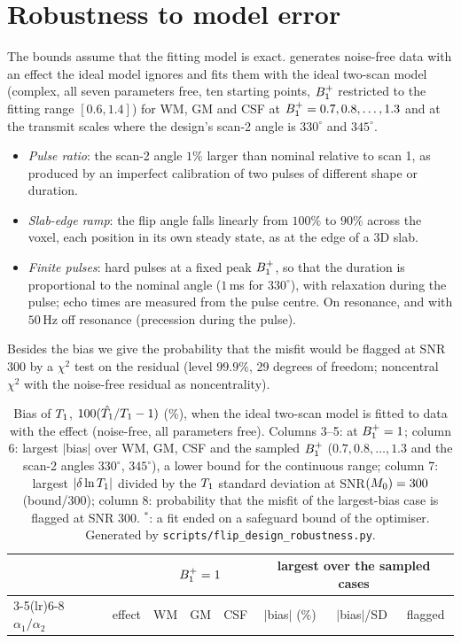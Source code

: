 \section{Robustness to model error}\label{sec:robustness}

The bounds assume that the fitting model is exact.  generates noise-free
data with an effect the ideal model ignores and fits them with the ideal two-scan model (complex,
all seven parameters free, ten starting points, $B_1^{+}$ restricted to the fitting range $[0.6,1.4]$) for
WM, GM and CSF at $B_1^{+}=0.7,0.8,\dots,1.3$ and at the transmit scales where the design's scan-2 angle is
$330^\circ$ and $345^\circ$.
\begin{itemize}
\item \emph{Pulse ratio}: the scan-2 angle $1\%$ larger than nominal relative to scan 1, as produced
  by an imperfect calibration of two pulses of different shape or duration.
\item \emph{Slab-edge ramp}: the flip angle falls linearly from $100\%$ to $90\%$ across the voxel, each
  position in its own steady state, as at the edge of a 3D slab.
\item \emph{Finite pulses}: hard pulses at a fixed peak $B_1^{+}$, so that the duration is proportional to
  the nominal angle ($1$\,ms for $330^\circ$), with relaxation during the pulse; echo times are measured
  from the pulse centre. On resonance, and with $50$\,Hz off resonance (precession during the pulse).
\end{itemize}
Besides the bias we give the probability that the misfit would be flagged at SNR 300 by a $\chi^2$
test on the residual (level $99.9\%$, 29 degrees of freedom; noncentral $\chi^2$ with the noise-free
residual as noncentrality).

\begin{table}[!htbp]
\centering
\caption{Bias of $T_1$, $100(\hat{T_1}/T_1-1)$ (\%), when the ideal two-scan model is fitted to data with
the effect (noise-free, all parameters free). Columns 3--5: at $B_1^{+}=1$; column 6: largest $|$bias$|$ over
WM, GM, CSF and the sampled $B_1^{+}$ ($0.7,0.8,\dots,1.3$ and the scan-2 angles $330^\circ$, $345^\circ$), a lower bound
for the continuous range; column 7: largest $|\delta\ln T_1|$ divided by the $T_1$
standard deviation at SNR$(M_0)=300$ (bound/300); column 8: probability that the misfit of the
largest-bias case is flagged at SNR 300. $^*$: a fit ended on a safeguard bound of the optimiser.
Generated by \texttt{scripts/flip\_design\_robustness.py}.}
\label{tab:robustness}
\small\setlength{\tabcolsep}{4pt}
\begin{tabular}{llcccccc}
\toprule
& & \multicolumn{3}{c}{$B_1^{+}=1$} & \multicolumn{3}{c}{largest over the sampled cases}\\
\cmidrule(lr){3-5}\cmidrule(lr){6-8}
$\alpha_1/\alpha_2$ & effect & WM & GM & CSF & $|$bias$|$ (\%) & $|$bias$|$/SD & flagged\\
\midrule

\bottomrule
\end{tabular}
\end{table}

